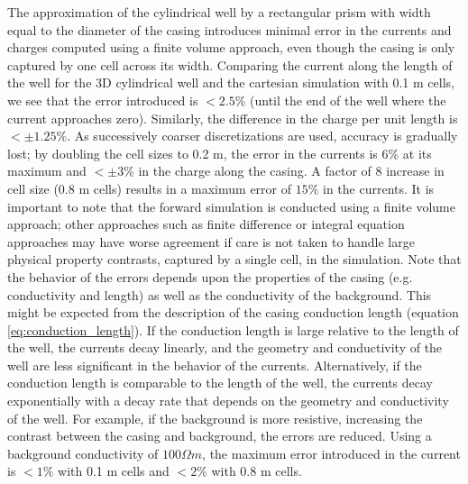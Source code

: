 

The approximation of the cylindrical well by a rectangular prism with width equal to the diameter of the casing introduces minimal error in the currents and charges computed using a finite volume approach, even though the casing is only captured by one cell across its width. Comparing the current along the length of the well for the 3D cylindrical well and the cartesian simulation with 0.1 m cells, we see that the error introduced is $< 2.5\%$ (until the end of the well where the current approaches zero). Similarly, the difference in the charge per unit length is $< \pm 1.25\%$. As successively coarser discretizations are used, accuracy is gradually lost; by doubling the cell sizes to 0.2 m, the error in the currents is $6\%$ at its maximum and $< \pm 3\%$ in the charge along the casing. A factor of 8 increase in cell size (0.8 m cells) results in a maximum error of $15\%$ in the currents. It is important to note that the forward simulation is conducted using a finite volume approach; other approaches such as finite difference or integral equation approaches may have worse agreement if care is not taken to handle large physical property contrasts, captured by a single cell, in the simulation.
Note that the behavior of the errors depends upon the properties of the casing (e.g. conductivity and length) as well as the conductivity of the background. This might be expected from the description of the casing conduction length (equation \ref{eq:conduction_length}). If the conduction length is large relative to the length of the well, the currents decay linearly, and the geometry and conductivity of the well are less significant in the behavior of the currents. Alternatively, if the conduction length is comparable to the length of the well, the currents decay exponentially with a decay rate that depends on the geometry and conductivity of the well. For example, if the background is more resistive, increasing the contrast between the casing and background, the errors are reduced. Using a background conductivity of $100 \Omega m$, the maximum error introduced in the current is $< 1\%$ with 0.1 m cells and $< 2\%$ with 0.8 m cells.


